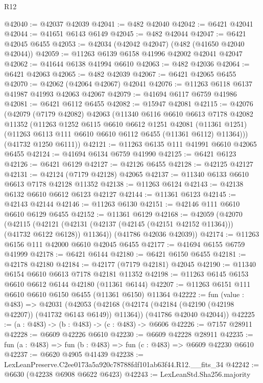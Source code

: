 \begin{lexlean}{R12}
\begin{coremodule}
@42040 := @42037 @42039
@42041 := @482 @42040
@42042 := @6421 @42041
@42044 := @41651 @6143 @6149
@42045 := @482 @42044
@42047 := @6421 @42045 @6455
@42053 := @42034 (@42042 @42047) (@482 (@41650 @42040 @42044))
@42059 := @11263 @6139 @6158 @41996 @42002 @42041 @42047
@42062 := @41644 @6138 @41994 @6610
@42063 := @482 @42036
@42064 := @6421 @42063
@42065 := @482 @42039
@42067 := @6421 @42065 @6455
@42070 := @42062 (@42064 @42067) @42041
@42076 := @11263 @6118 @6137 @41987 @41993 @42063 @42067
@42079 := @41694 @6117 @6759 @41986
@42081 := @6421 @6112 @6455
@42082 := @15947 @42081
@42115 := @42076
    (@42079
      (@7179 @42082)
      @42063
      (@11340
        @6116
        @6610
        @6613
        @7178
        @42082
        @11352
        (@11263
          @1252
          @6115
          @6610
          @6612
          @1251
          @42081
          (@11361 @1251)
          (@11263 @6113 @111 @6610 @6610 @6112 @6455 (@11361 @6112) @11364)))
      (@41732 @1250 @6111))
@42121 := @11263 @6135 @111 @41991 @6610 @42065 @6455
@42124 := @41694 @6134 @6759 @41990
@42125 := @6421 @6123
@42126 := @6421 @6129
@42127 := @42126 @6455
@42128 := @42125 @42127
@42131 := @42124 (@7179 @42128) @42065
@42137 := @11340 @6133 @6610 @6613 @7178 @42128 @11352
@42138 := @11263 @6124
@42143 := @42138 @6132 @6610 @6612 @6123 @42127
@42144 := @11361 @6123
@42145 := @42143 @42144
@42146 := @11263 @6130
@42151 := @42146 @111 @6610 @6610 @6129 @6455
@42152 := @11361 @6129
@42168 := @42059
    (@42070
      (@42115
        (@42121 (@42131 (@42137 (@42145 (@42151 @42152 @11364))) (@41732 @6122 @6128)) @11364))
      (@41786 @42036 @42039))
@42174 := @11263 @6156 @111 @42000 @6610 @42045 @6455
@42177 := @41694 @6155 @6759 @41999
@42178 := @6421 @6144
@42180 := @6421 @6150 @6455
@42181 := @42178 @42180
@42184 := @42177 (@7179 @42181) @42045
@42190 := @11340 @6154 @6610 @6613 @7178 @42181 @11352
@42198 := @11263 @6145 @6153 @6610 @6612 @6144 @42180 (@11361 @6144)
@42207 := @11263 @6151 @111 @6610 @6610 @6150 @6455 (@11361 @6150) @11364
@42222 := fun (value : @483) =>
  @42031
    (@42053
      (@42168 (@42174 (@42184 (@42190 (@42198 @42207)) (@41732 @6143 @6149)) @11364))
      (@41786 @42040 @42044))
@42225 := (a : @483) -> (b : @483) -> (c : @483) -> @6606
@42226 := @7157 @28911
@42228 := @6609 @42226 @6610
@42230 := @6609 @42228 @28911
@42235 := fun (a : @483) => fun (b : @483) => fun (c : @483) => @6609 @42230 @6610
@42237 := @6620 @4905 @41439
@42238 := LexLeanPreserve.C2ee0173a5a920c78788fdf101ab63f44.R12.__fits_34
@42242 := @6630 (@42238 @6908 @6622 @6423)
@42243 := LexLeanStd.Sha256.majority

\end{coremodule}
\end{lexlean}
